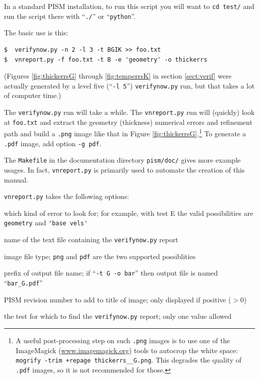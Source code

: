 \documentclass[11pt,final]{amsart}
\newcommand{\und}{\_\!\_}
\begin{document}
In a standard PISM installation, to run this script you will want to \verb|cd test/| and run the script there with ``\verb|./|'' or ``\verb|python|''.

The basic use is this:

\begin{verbatim}
$  verifynow.py -n 2 -l 3 -t BGIK >> foo.txt
$  vnreport.py -f foo.txt -t B -e 'geometry' -o thickerrs
\end{verbatim}
(Figures \ref{fig:thickerrsG} through \ref{fig:temperrsK} in section \ref{sect:verif} were actually generated by a level five (``\verb|-l 5|'') \verb|verifynow.py| run, but that takes a lot of computer time.)

The \verb|verifynow.py| run will take a while.  The \verb|vnreport.py| run will (quickly) look at \verb|foo.txt| and extract the geometry (thickness) numerical errors and refinement path and build a \verb|.png| image like that in Figure \ref{fig:thickerrsG}.\footnote{A useful post-processing step on such \texttt{.png} images is to use one of the ImageMagick (\href{http://www.imagemagick.org/}{www.imagemagick.org}) tools to autocrop the white space: \texttt{mogrify -trim +repage thickerrs\und G.png}.  This degrades the quality of \texttt{.pdf} images, so it is not recommended for those.}  To generate a \verb|.pdf| image, add option \verb|-g pdf|.

The \verb|Makefile| in the documentation directory \verb|pism/doc/| gives more example usages.  In fact, \verb|vnreport.py| is primarily used to automate the creation of this manual.

\opthead  \verb|vnreport.py| takes the following options:

 which kind of error to look for; for example, with test E the valid possibilities are \verb|geometry| and \verb|'base vels'|

 name of the text file containing the \verb|verifynow.py| report

 image file type; \verb|png| and \verb|pdf| are the two supported possiblities

 prefix of output file name; if ``\verb|-t G -o bar|'' then output file is named ``\verb|bar_G.pdf|''

 PISM revision number to add to title of image; only displayed if positive ($>0$)

 the test for which to find the \verb|verifynow.py| report; only one value allowed
\end{document}
